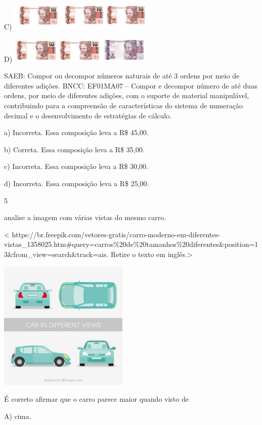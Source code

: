 \begin{itemize}
\begin{itemize}
C)
\includegraphics[width=2.80247in,height=0.53132in]{media/image144.png}

D)
\includegraphics[width=2.69829in,height=0.46882in]{media/image145.png}

SAEB: Compor ou decompor números naturais de até 3 ordens por meio
de diferentes adições.
BNCC: EF01MA07 -- Compor e decompor número de até duas ordens, por meio
de diferentes adições, com o suporte de material manipulável,
contribuindo para a compreensão de características do sistema de
numeração decimal e o desenvolvimento de estratégias de cálculo.

a) Incorreta. Essa composição leva a R\$ 45,00.

b) Correta. Essa composição leva a R\$ 35,00.

c) Incorreta. Essa composição leva a R\$ 30,00.

d) Incorreta. Essa composição leva a R\$ 25,00.

\num{5}

analise a imagem com várias vistas do mesmo carro.

\textless{}
https://br.freepik.com/vetores-gratis/carro-moderno-em-diferentes-vistas\_1358025.htm\#query=carros\%20de\%20tamanhos\%20diferentes\&position=13\&from\_view=search\&track=ais.
Retire o texto em inglês.\textgreater{}

\includegraphics[width=2.43750in,height=2.43750in]{media/image146.jpg}

É correto afirmar que o carro parece maior quando visto de

A) cima.


\end{itemize}
\end{itemize}
